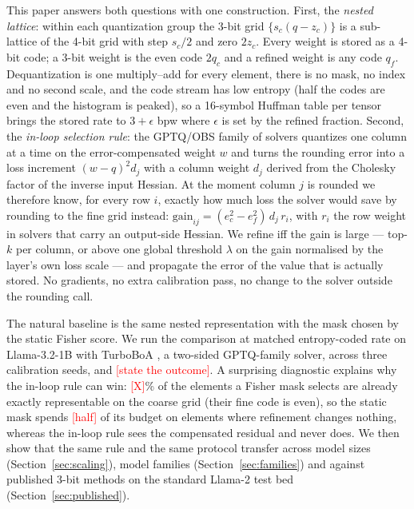 \documentclass{article}
\newcommand{\tbd}[1]{\textcolor{red}{[#1]}}
\newcommand{\gain}{\mathrm{gain}}
\begin{document}
This paper answers both questions with one construction. First, the
\emph{nested lattice}: within each quantization group the 3-bit grid
$\{s_c(q - z_c)\}$ is a sub-lattice of the 4-bit grid with step $s_c/2$
and zero $2z_c$. Every weight is stored as a 4-bit code; a 3-bit weight
is the even code $2q_c$ and a refined weight is any code $q_f$.
Dequantization is one multiply--add for every element, there is no mask,
no index and no second scale, and the code stream has low entropy (half
the codes are even and the histogram is peaked), so a 16-symbol Huffman
table per tensor brings the stored rate to $3+\epsilon$ bpw where
$\epsilon$ is set by the refined fraction. Second, the \emph{in-loop
selection rule}: the GPTQ/OBS family of solvers
\citep{frantar2022obc,frantar2023gptq} quantizes one column at a time on
the error-compensated weight $w$ and turns the rounding error into a loss
increment $(w-q)^2 d_j$ with a column weight $d_j$ derived from the
Cholesky factor of the inverse input Hessian. At the moment column $j$ is
rounded we therefore know, for every row $i$, exactly how much loss the
solver would save by rounding to the fine grid instead: $\gain_{ij} =
(e_c^2 - e_f^2)\, d_j\, r_i$, with $r_i$ the row weight in solvers that
carry an output-side Hessian. We refine iff the gain is large --- top-$k$
per column, or above one global threshold $\lambda$ on the gain
normalised by the layer's own loss scale --- and propagate the error of
the value that is actually stored. No gradients, no extra calibration
pass, no change to the solver outside the rounding call.

The natural baseline is the same nested representation with the mask
chosen by the static Fisher score. We run the comparison at matched
entropy-coded rate on Llama-3.2-1B \citep{grattafiori2024llama3} with
TurboBoA \citep{kim2025boa}, a two-sided GPTQ-family solver, across three
calibration seeds, and \tbd{state the outcome}. A surprising diagnostic
explains why the in-loop rule can win: \tbd{X}\% of the elements a
Fisher mask selects are already exactly representable on the coarse grid
(their fine code is even), so the static mask spends \tbd{half} of its
budget on elements where refinement changes nothing, whereas the in-loop
rule sees the compensated residual and never does. We then show that the
same rule and the same protocol transfer across model sizes
(Section~\ref{sec:scaling}), model families (Section~\ref{sec:families})
and against published 3-bit methods on the standard Llama-2 test bed
(Section~\ref{sec:published}).
\end{document}
